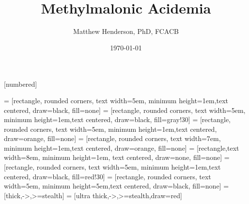 \documentclass[presentation, smaller]{beamer}
\author{Matthew Henderson, PhD, FCACB}
\date{\today}
\title{Methylmalonic Acidemia}
\institute[NSO]{Newborn Screening Ontario | The University of Ottawa}
\begin{document}
\maketitle

\vspace{220pt}
\beamertemplatenavigationsymbolsempty
{}[numbered]

 = [rectangle, rounded corners, text width=5em, minimum height=1em,text centered, draw=black, fill=none]
 = [rectangle, rounded corners, text width=5em, minimum height=1em,text centered, draw=black, fill=gray!30]
 = [rectangle, rounded corners, text width=5em, minimum height=1em,text centered, draw=orange, fill=none]
 = [rectangle, rounded corners, text width=7em, minimum height=1em,text centered, draw=orange, fill=none]
 = [rectangle,text width=8em, minimum height=1em, text centered, draw=none, fill=none]
 = [rectangle, rounded corners, text width=5em, minimum height=1em,text centered, draw=black, fill=red!30]
 = [rectangle, rounded corners, text width=5em, minimum height=5em,text centered, draw=black, fill=none]
 = [thick,->,>=stealth]
 = [ultra thick,->,>=stealth,draw=red]
\end{document}
